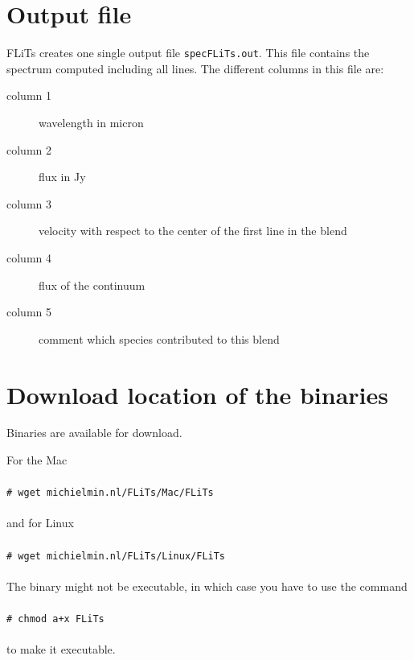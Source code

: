 \documentclass[12pt]{article}
\newcommand{\shellcmd}[1]{\\ \\ \indent\indent\texttt{\# #1}\\ \\ }
\begin{document}
\section{Output file}

FLiTs creates one single output file \texttt{specFLiTs.out}. This file contains the spectrum computed including all lines. The different columns in this file are:
\begin{description}
\item[column 1] wavelength in micron
\item[column 2] flux in Jy
\item[column 3] velocity with respect to the center of the first line in the blend
\item[column 4] flux of the continuum
\item[column 5] comment which species contributed to this blend
\end{description}

\section{Download location of the binaries}

Binaries are available for download.

For the Mac
%
\shellcmd{wget michielmin.nl/FLiTs/Mac/FLiTs}
%
and for Linux
%
\shellcmd{wget michielmin.nl/FLiTs/Linux/FLiTs}
%
The binary might not be executable, in which case you have to use the command
%
\shellcmd{chmod a+x FLiTs}
%
to make it executable.
\end{document}

